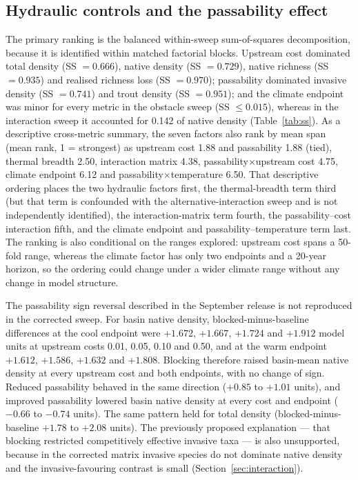 \documentclass[11pt,a4paper]{article}
\begin{document}
\subsection{Hydraulic controls and the passability effect}

The primary ranking is the balanced within-sweep sum-of-squares decomposition, because it is identified within matched factorial blocks. Upstream cost dominated total density (SS $=0.666$), native density (SS $=0.729$), native richness (SS $=0.935$) and realised richness loss (SS $=0.970$); passability dominated invasive density (SS $=0.741$) and trout density (SS $=0.951$); and the climate endpoint was minor for every metric in the obstacle sweep (SS $\le 0.015$), whereas in the interaction sweep it accounted for 0.142 of native density (Table~\ref{tab:ss}). As a descriptive cross-metric summary, the seven factors also rank by mean span (mean rank, 1 = strongest) as upstream cost 1.88 and passability 1.88 (tied), thermal breadth 2.50, interaction matrix 4.38, passability$\times$upstream cost 4.75, climate endpoint 6.12 and passability$\times$temperature 6.50. That descriptive ordering places the two hydraulic factors first, the thermal-breadth term third (but that term is confounded with the alternative-interaction sweep and is not independently identified), the interaction-matrix term fourth, the passability--cost interaction fifth, and the climate endpoint and passability--temperature term last. The ranking is also conditional on the ranges explored: upstream cost spans a 50-fold range, whereas the climate factor has only two endpoints and a 20-year horizon, so the ordering could change under a wider climate range without any change in model structure.

The passability sign reversal described in the September release is not reproduced in the corrected sweep. For basin native density, blocked-minus-baseline differences at the cool endpoint were $+1.672$, $+1.667$, $+1.724$ and $+1.912$ model units at upstream costs 0.01, 0.05, 0.10 and 0.50, and at the warm endpoint $+1.612$, $+1.586$, $+1.632$ and $+1.808$. Blocking therefore raised basin-mean native density at every upstream cost and both endpoints, with no change of sign. Reduced passability behaved in the same direction ($+0.85$ to $+1.01$ units), and improved passability lowered basin native density at every cost and endpoint ($-0.66$ to $-0.74$ units). The same pattern held for total density (blocked-minus-baseline $+1.78$ to $+2.08$ units). The previously proposed explanation --- that blocking restricted competitively effective invasive taxa --- is also unsupported, because in the corrected matrix invasive species do not dominate native density and the invasive-favouring contrast is small (Section~\ref{sec:interaction}).
\end{document}

